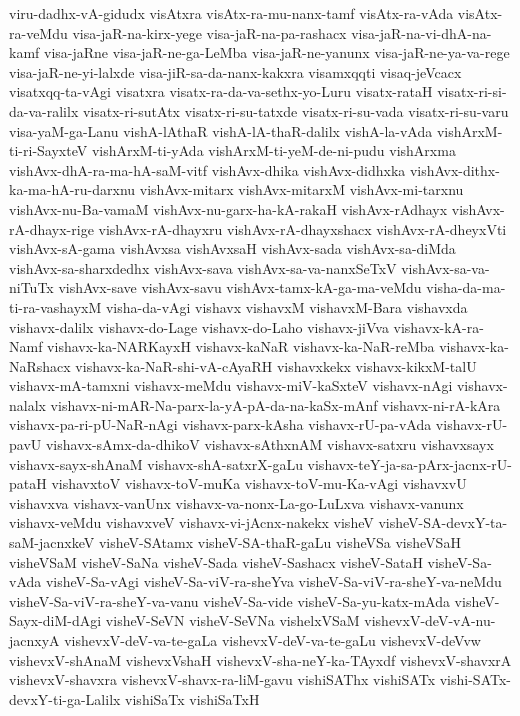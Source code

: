 {viru-dadhx-vA-gidudx
visAtxra
visAtx-ra-mu-nanx-tamf
visAtx-ra-vAda
visAtx-ra-veMdu
visa-jaR-na-kirx-yege
visa-jaR-na-pa-rashacx
visa-jaR-na-vi-dhA-na-kamf
visa-jaRne
visa-jaR-ne-ga-LeMba
visa-jaR-ne-yanunx
visa-jaR-ne-ya-va-rege
visa-jaR-ne-yi-lalxde
visa-jiR-sa-da-nanx-kakxra
visamxqqti
visaq-jeVcacx
visatxqq-ta-vAgi
visatxra
visatx-ra-da-va-sethx-yo-Luru
visatx-rataH
visatx-ri-si-da-va-ralilx
visatx-ri-sutAtx
visatx-ri-su-tatxde
visatx-ri-su-vada
visatx-ri-su-varu
visa-yaM-ga-Lanu
vishA-lAthaR
vishA-lA-thaR-dalilx
vishA-la-vAda
vishArxM-ti-ri-SayxteV
vishArxM-ti-yAda
vishArxM-ti-yeM-de-ni-pudu
vishArxma
vishAvx-dhA-ra-ma-hA-saM-vitf
vishAvx-dhika
vishAvx-didhxka
vishAvx-dithx-ka-ma-hA-ru-darxnu
vishAvx-mitarx
vishAvx-mitarxM
vishAvx-mi-tarxnu
vishAvx-nu-Ba-vamaM
vishAvx-nu-garx-ha-kA-rakaH
vishAvx-rAdhayx
vishAvx-rA-dhayx-rige
vishAvx-rA-dhayxru
vishAvx-rA-dhayxshacx
vishAvx-rA-dheyxVti
vishAvx-sA-gama
vishAvxsa
vishAvxsaH
vishAvx-sada
vishAvx-sa-diMda
vishAvx-sa-sharxdedhx
vishAvx-sava
vishAvx-sa-va-nanxSeTxV
vishAvx-sa-va-niTuTx
vishAvx-save
vishAvx-savu
vishAvx-tamx-kA-ga-ma-veMdu
visha-da-ma-ti-ra-vashayxM
visha-da-vAgi
vishavx
vishavxM
vishavxM-Bara
vishavxda
vishavx-dalilx
vishavx-do-Lage
vishavx-do-Laho
vishavx-jiVva
vishavx-kA-ra-Namf
vishavx-ka-NARKayxH
vishavx-kaNaR
vishavx-ka-NaR-reMba
vishavx-ka-NaRshacx
vishavx-ka-NaR-shi-vA-cAyaRH
vishavxkekx
vishavx-kikxM-talU
vishavx-mA-tamxni
vishavx-meMdu
vishavx-miV-kaSxteV
vishavx-nAgi
vishavx-nalalx
vishavx-ni-mAR-Na-parx-la-yA-pA-da-na-kaSx-mAnf
vishavx-ni-rA-kAra
vishavx-pa-ri-pU-NaR-nAgi
vishavx-parx-kAsha
vishavx-rU-pa-vAda
vishavx-rU-pavU
vishavx-sAmx-da-dhikoV
vishavx-sAthxnAM
vishavx-satxru
vishavxsayx
vishavx-sayx-shAnaM
vishavx-shA-satxrX-gaLu
vishavx-teY-ja-sa-pArx-jacnx-rU-pataH
vishavxtoV
vishavx-toV-muKa
vishavx-toV-mu-Ka-vAgi
vishavxvU
vishavxva
vishavx-vanUnx
vishavx-va-nonx-La-go-LuLxva
vishavx-vanunx
vishavx-veMdu
vishavxveV
vishavx-vi-jAcnx-nakekx
visheV
visheV-SA-devxY-ta-saM-jacnxkeV
visheV-SAtamx
visheV-SA-thaR-gaLu
visheVSa
visheVSaH
visheVSaM
visheV-SaNa
visheV-Sada
visheV-Sashacx
visheV-SataH
visheV-Sa-vAda
visheV-Sa-vAgi
visheV-Sa-viV-ra-sheYva
visheV-Sa-viV-ra-sheY-va-neMdu
visheV-Sa-viV-ra-sheY-va-vanu
visheV-Sa-vide
visheV-Sa-yu-katx-mAda
visheV-Sayx-diM-dAgi
visheV-SeVN
visheV-SeVNa
vishelxVSaM
vishevxV-deV-vA-nu-jacnxyA
vishevxV-deV-va-te-gaLa
vishevxV-deV-va-te-gaLu
vishevxV-deVvw
vishevxV-shAnaM
vishevxVshaH
vishevxV-sha-neY-ka-TAyxdf
vishevxV-shavxrA
vishevxV-shavxra
vishevxV-shavx-ra-liM-gavu
vishiSAThx
vishiSATx
vishi-SATx-devxY-ti-ga-Lalilx
vishiSaTx
vishiSaTxH
}
